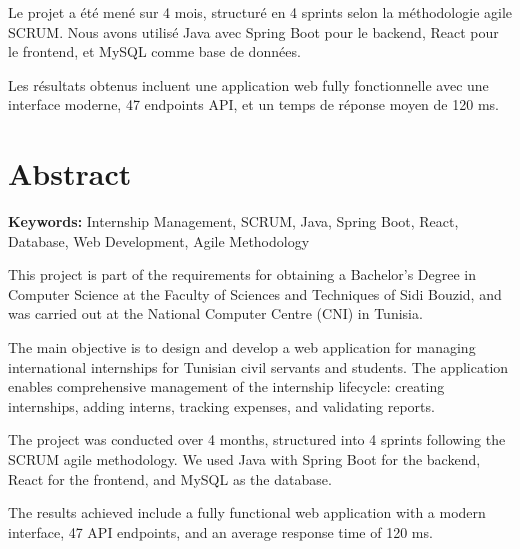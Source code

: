 \documentclass[12pt,a4paper]{report}
\begin{document}
Le projet a été mené sur 4 mois, structuré en 4 sprints selon la méthodologie agile SCRUM. Nous avons utilisé Java avec Spring Boot pour le backend, React pour le frontend, et MySQL comme base de données.

Les résultats obtenus incluent une application web fully fonctionnelle avec une interface moderne, 47 endpoints API, et un temps de réponse moyen de 120 ms.

\vspace{1cm}

\chapter*{Abstract}

\noindent \textbf{Keywords:} Internship Management, SCRUM, Java, Spring Boot, React, Database, Web Development, Agile Methodology

\vspace{0.5cm}

This project is part of the requirements for obtaining a Bachelor's Degree in Computer Science at the Faculty of Sciences and Techniques of Sidi Bouzid, and was carried out at the National Computer Centre (CNI) in Tunisia.

The main objective is to design and develop a web application for managing international internships for Tunisian civil servants and students. The application enables comprehensive management of the internship lifecycle: creating internships, adding interns, tracking expenses, and validating reports.

The project was conducted over 4 months, structured into 4 sprints following the SCRUM agile methodology. We used Java with Spring Boot for the backend, React for the frontend, and MySQL as the database.

The results achieved include a fully functional web application with a modern interface, 47 API endpoints, and an average response time of 120 ms.

\end{document}
